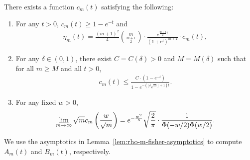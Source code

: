 \begin{lemma} \label{lem:rho-m-fisher-asymptotics}
  There exists a function $c_m(t)$ satisfying the following:
  \begin{enumerate}[leftmargin=*,label=(\roman*)]
  \item \label{item:eta-via-c}
    For any $t > 0$, $c_m(t) \geq 1 - e^{-t}$ and
    \begin{align*}
      \eta_m(t) = \frac{(m+1)^2}{4} \binom{m}{\frac{m+1}{2}} \cdot \frac{e^{\frac{m+3}{2}t}}{(1+e^t)^{m+2}} \cdot c_m(t),
    \end{align*}
  \item \label{item:c-m-by-delta} For any $\delta \in (0,1)$, there exist
    $C=C(\delta) > 0$ and $M=M(\delta)$ such that for all $m \geq M$
    and all $t > 0$,
    \begin{align*}
      c_m(t) \leq
      \frac{C \cdot(1 - e^{-t})}{1 - e^{-(\lfloor \delta \sqrt{m} \rfloor + 1) t}}.
    \end{align*}
  \item \label{item:normal-ratio-limit}
    For any fixed $w > 0$,
    \begin{align*}
      \lim_{m \to \infty} \sqrt{m} c_m \left({\frac{w}{\sqrt{m}}}\right)  = e^{-\frac{w^2}{8}} \sqrt{\frac{2}{\pi}} \cdot \frac{1}{\Phi(-w/2) \Phi(w/2)}.
    \end{align*}
  \end{enumerate}
\end{lemma}

We use the asymptotics in Lemma~\ref{lem:rho-m-fisher-asymptotics} to
compute $A_m(t)$ and $B_m(t)$, respectively.

